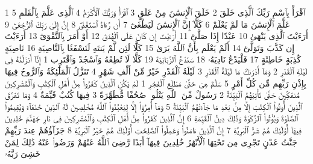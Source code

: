 {\tiny\colorbox{cl_aya}{1}} ٱقْرَأْ بِٱسْمِ رَبِّكَ ٱلَّذِى خَلَقَ
{\tiny\colorbox{cl_aya}{2}} خَلَقَ ٱلْإِنسَٰنَ مِنْ عَلَقٍ
{\tiny\colorbox{cl_aya}{3}} ٱقْرَأْ وَرَبُّكَ ٱلْأَكْرَمُ
{\tiny\colorbox{cl_aya}{4}} ٱلَّذِى عَلَّمَ بِٱلْقَلَمِ
{\tiny\colorbox{cl_aya}{5}} عَلَّمَ ٱلْإِنسَٰنَ مَا لَمْ يَعْلَمْ
{\tiny\colorbox{cl_aya}{6}} كَلَّآ إِنَّ ٱلْإِنسَٰنَ لَيَطْغَىٰٓ
{\tiny\colorbox{cl_aya}{7}} أَن رَّءَاهُ ٱسْتَغْنَىٰٓ
{\tiny\colorbox{cl_aya}{8}} إِنَّ إِلَىٰ رَبِّكَ ٱلرُّجْعَىٰٓ
{\tiny\colorbox{cl_aya}{9}} أَرَءَيْتَ ٱلَّذِى يَنْهَىٰ
{\tiny\colorbox{cl_aya}{10}} عَبْدًا إِذَا صَلَّىٰٓ
{\tiny\colorbox{cl_aya}{11}} أَرَءَيْتَ إِن كَانَ عَلَى ٱلْهُدَىٰٓ
{\tiny\colorbox{cl_aya}{12}} أَوْ أَمَرَ بِٱلتَّقْوَىٰٓ
{\tiny\colorbox{cl_aya}{13}} أَرَءَيْتَ إِن كَذَّبَ وَتَوَلَّىٰٓ
{\tiny\colorbox{cl_aya}{14}} أَلَمْ يَعْلَم بِأَنَّ ٱللَّهَ يَرَىٰ
{\tiny\colorbox{cl_aya}{15}} كَلَّا لَئِن لَّمْ يَنتَهِ لَنَسْفَعًۢا بِٱلنَّاصِيَةِ
{\tiny\colorbox{cl_aya}{16}} نَاصِيَةٍ كَٰذِبَةٍ خَاطِئَةٍ
{\tiny\colorbox{cl_aya}{17}} فَلْيَدْعُ نَادِيَهُۥ
{\tiny\colorbox{cl_aya}{18}} سَنَدْعُ ٱلزَّبَانِيَةَ
{\tiny\colorbox{cl_aya}{19}} كَلَّا لَا تُطِعْهُ وَٱسْجُدْ وَٱقْتَرِب
{\tiny\colorbox{cl_aya}{1}} إِنَّآ أَنزَلْنَٰهُ فِى لَيْلَةِ ٱلْقَدْرِ
{\tiny\colorbox{cl_aya}{2}} وَمَآ أَدْرَىٰكَ مَا لَيْلَةُ ٱلْقَدْرِ
{\tiny\colorbox{cl_aya}{3}} لَيْلَةُ ٱلْقَدْرِ خَيْرٌ مِّنْ أَلْفِ شَهْرٍ
{\tiny\colorbox{cl_aya}{4}} تَنَزَّلُ ٱلْمَلَٰٓئِكَةُ وَٱلرُّوحُ فِيهَا بِإِذْنِ رَبِّهِم مِّن كُلِّ أَمْرٍ
{\tiny\colorbox{cl_aya}{5}} سَلَٰمٌ هِىَ حَتَّىٰ مَطْلَعِ ٱلْفَجْرِ
{\tiny\colorbox{cl_aya}{1}} لَمْ يَكُنِ ٱلَّذِينَ كَفَرُوا۟ مِنْ أَهْلِ ٱلْكِتَٰبِ وَٱلْمُشْرِكِينَ مُنفَكِّينَ حَتَّىٰ تَأْتِيَهُمُ ٱلْبَيِّنَةُ
{\tiny\colorbox{cl_aya}{2}} رَسُولٌ مِّنَ ٱللَّهِ يَتْلُوا۟ صُحُفًا مُّطَهَّرَةً
{\tiny\colorbox{cl_aya}{3}} فِيهَا كُتُبٌ قَيِّمَةٌ
{\tiny\colorbox{cl_aya}{4}} وَمَا تَفَرَّقَ ٱلَّذِينَ أُوتُوا۟ ٱلْكِتَٰبَ إِلَّا مِنۢ بَعْدِ مَا جَآءَتْهُمُ ٱلْبَيِّنَةُ
{\tiny\colorbox{cl_aya}{5}} وَمَآ أُمِرُوٓا۟ إِلَّا لِيَعْبُدُوا۟ ٱللَّهَ مُخْلِصِينَ لَهُ ٱلدِّينَ حُنَفَآءَ وَيُقِيمُوا۟ ٱلصَّلَوٰةَ وَيُؤْتُوا۟ ٱلزَّكَوٰةَ وَذَٰلِكَ دِينُ ٱلْقَيِّمَةِ
{\tiny\colorbox{cl_aya}{6}} إِنَّ ٱلَّذِينَ كَفَرُوا۟ مِنْ أَهْلِ ٱلْكِتَٰبِ وَٱلْمُشْرِكِينَ فِى نَارِ جَهَنَّمَ خَٰلِدِينَ فِيهَآ أُو۟لَٰٓئِكَ هُمْ شَرُّ ٱلْبَرِيَّةِ
{\tiny\colorbox{cl_aya}{7}} إِنَّ ٱلَّذِينَ ءَامَنُوا۟ وَعَمِلُوا۟ ٱلصَّٰلِحَٰتِ أُو۟لَٰٓئِكَ هُمْ خَيْرُ ٱلْبَرِيَّةِ
{\tiny\colorbox{cl_aya}{8}} جَزَآؤُهُمْ عِندَ رَبِّهِمْ جَنَّٰتُ عَدْنٍ تَجْرِى مِن تَحْتِهَا ٱلْأَنْهَٰرُ خَٰلِدِينَ فِيهَآ أَبَدًا رَّضِىَ ٱللَّهُ عَنْهُمْ وَرَضُوا۟ عَنْهُ ذَٰلِكَ لِمَنْ خَشِىَ رَبَّهُۥ
